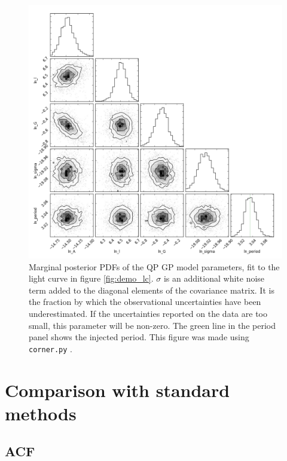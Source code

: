 \documentclass[useAMS, usenatbib, preprint, 12pt]{aastex}
\begin{document}
\begin{figure}
\begin{center}
\includegraphics[width=6in, clip=true]{figures/25.png}
\caption{Marginal posterior PDFs of the QP GP model parameters, fit to the
    light curve in figure \ref{fig:demo_lc}.
$\sigma$ is an
additional white noise term added to the diagonal elements of the covariance
matrix. It is the fraction by which the observational uncertainties have been
underestimated. If the uncertainties reported on the data are too small, this
parameter will be non-zero.
    The green line in the period panel shows the injected period.
    This figure was made using \texttt{corner.py} \citep{Corner}.}
\label{fig:gp_posteriors}
\end{center}
\end{figure}


\section{Comparison with standard methods}
\label{sec:comparison}
\subsection{ACF}
\end{document}
